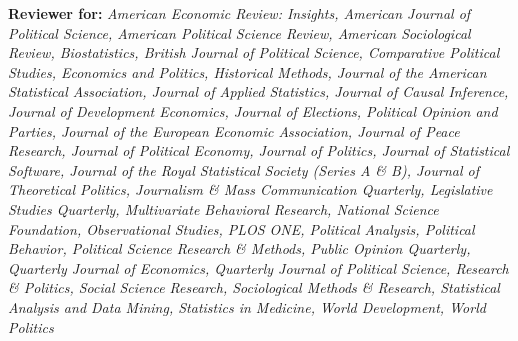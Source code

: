 \documentclass[11pt,article,oneside]{memoir}
\begin{document}
\begin{cvlist}
\item \textbf{Reviewer for:} \emph{American Economic Review: Insights, American Journal of Political Science, American Political Science Review, American Sociological Review, Biostatistics, British Journal of Political Science, Comparative Political Studies, Economics and Politics, Historical Methods, Journal of the American Statistical Association, Journal of Applied Statistics, Journal of Causal Inference, Journal of Development Economics, Journal of Elections, Political Opinion and Parties, Journal of the European Economic Association, Journal of Peace Research, Journal of Political Economy, Journal of Politics, Journal of Statistical Software, Journal of the Royal Statistical Society (Series A \& B), Journal of Theoretical Politics, Journalism \& Mass Communication Quarterly, Legislative Studies Quarterly, Multivariate Behavioral Research, National Science Foundation, Observational Studies, PLOS ONE, Political Analysis, Political Behavior, Political Science Research \& Methods, Public Opinion Quarterly, Quarterly Journal of Economics, Quarterly Journal of Political Science, Research \& Politics, Social Science Research, Sociological Methods \& Research,  Statistical Analysis and Data Mining, Statistics in Medicine, World Development, World Politics} 


\end{cvlist}
\end{document}

